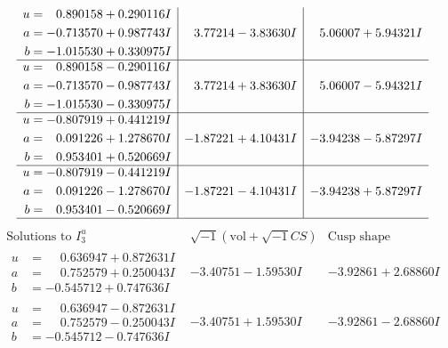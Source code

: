 \documentclass[1p]{elsarticle_modified}
\theoremstyle{definition}
\newcommand{\I}{\sqrt{-1}}
\begin{document}
$$\begin{array}{c|c|c}
\begin{aligned}
u &= \phantom{-}0.890158 + 0.290116 I \\
a &= -0.713570 + 0.987743 I \\
b &= -1.015530 + 0.330975 I\end{aligned}
 & \phantom{-}3.77214 - 3.83630 I & \phantom{-}5.06007 + 5.94321 I \\ \hline\begin{aligned}
u &= \phantom{-}0.890158 - 0.290116 I \\
a &= -0.713570 - 0.987743 I \\
b &= -1.015530 - 0.330975 I\end{aligned}
 & \phantom{-}3.77214 + 3.83630 I & \phantom{-}5.06007 - 5.94321 I \\ \hline\begin{aligned}
u &= -0.807919 + 0.441219 I \\
a &= \phantom{-}0.091226 + 1.278670 I \\
b &= \phantom{-}0.953401 + 0.520669 I\end{aligned}
 & -1.87221 + 4.10431 I & -3.94238 - 5.87297 I \\ \hline\begin{aligned}
u &= -0.807919 - 0.441219 I \\
a &= \phantom{-}0.091226 - 1.278670 I \\
b &= \phantom{-}0.953401 - 0.520669 I\end{aligned}
 & -1.87221 - 4.10431 I & -3.94238 + 5.87297 I\\
 \hline 
 \end{array}$$\newpage$$\begin{array}{c|c|c}  
\text{Solutions to }I^u_{3}& \I (\text{vol} + \sqrt{-1}CS) & \text{Cusp shape}\\
 \hline 
\begin{aligned}
u &= \phantom{-}0.636947 + 0.872631 I \\
a &= \phantom{-}0.752579 + 0.250043 I \\
b &= -0.545712 + 0.747636 I\end{aligned}
 & -3.40751 - 1.59530 I & -3.92861 + 2.68860 I \\ \hline\begin{aligned}
u &= \phantom{-}0.636947 - 0.872631 I \\
a &= \phantom{-}0.752579 - 0.250043 I \\
b &= -0.545712 - 0.747636 I\end{aligned}
 & -3.40751 + 1.59530 I & -3.92861 - 2.68860 I \\ \hline\begin{aligned}

\end{aligned}
\end{array}$$
\end{document}
